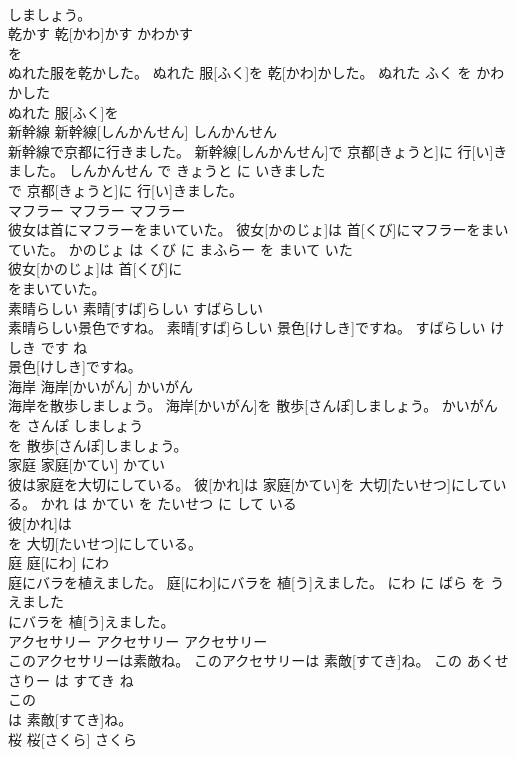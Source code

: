 \documentclass[8pt]{extreport}
\begin{document}
\begin{CJK}{UTF8}{min}
\\	しましょう。		
\\	乾かす	乾[かわ]かす	かわかす	
\\	を		
\\	ぬれた服を乾かした。	ぬれた 服[ふく]を 乾[かわ]かした。	ぬれた ふく を かわかした	
\\	ぬれた 服[ふく]を
\\	新幹線	新幹線[しんかんせん]	しんかんせん	
\\	新幹線で京都に行きました。	新幹線[しんかんせん]で 京都[きょうと]に 行[い]きました。	しんかんせん で きょうと に いきました	
\\	で 京都[きょうと]に 行[い]きました。		
\\	マフラー	マフラー	マフラー	
\\	彼女は首にマフラーをまいていた。	彼女[かのじょ]は 首[くび]にマフラーをまいていた。	かのじょ は くび に まふらー を まいて いた	
\\	彼女[かのじょ]は 首[くび]に
\\	をまいていた。		
\\	素晴らしい	素晴[すば]らしい	すばらしい	
\\	素晴らしい景色ですね。	素晴[すば]らしい 景色[けしき]ですね。	すばらしい けしき です ね	
\\	景色[けしき]ですね。		
\\	海岸	海岸[かいがん]	かいがん	
\\	海岸を散歩しましょう。	海岸[かいがん]を 散歩[さんぽ]しましょう。	かいがん を さんぽ しましょう	
\\	を 散歩[さんぽ]しましょう。		
\\	家庭	家庭[かてい]	かてい	
\\	彼は家庭を大切にしている。	彼[かれ]は 家庭[かてい]を 大切[たいせつ]にしている。	かれ は かてい を たいせつ に して いる	
\\	彼[かれ]は
\\	を 大切[たいせつ]にしている。		
\\	庭	庭[にわ]	にわ	
\\	庭にバラを植えました。	庭[にわ]にバラを 植[う]えました。	にわ に ばら を うえました	
\\	にバラを 植[う]えました。		
\\	アクセサリー	アクセサリー	アクセサリー	
\\	このアクセサリーは素敵ね。	このアクセサリーは 素敵[すてき]ね。	この あくせさりー は すてき ね	
\\	この
\\	は 素敵[すてき]ね。		
\\	桜	桜[さくら]	さくら	

\end{CJK}
\end{document}
